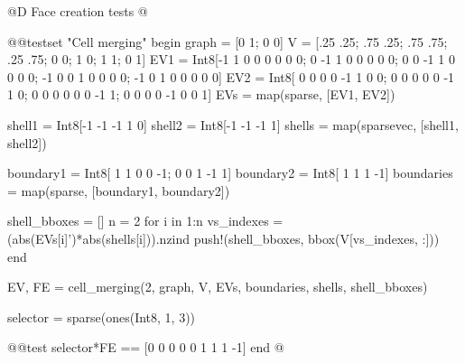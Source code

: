 @D Face creation tests
@{@@testset "Cell merging" begin
    graph = [0 1; 0 0]
    V = [.25 .25; .75 .25; .75 .75; .25 .75;
           0   0;   1   0;   1   1;   0   1]
    EV1 = Int8[-1  1  0  0  0  0  0  0;
                0 -1  1  0  0  0  0  0;
                0  0 -1  1  0  0  0  0;
               -1  0  0  1  0  0  0  0;
               -1  0  1  0  0  0  0  0]
    EV2 = Int8[ 0  0  0  0 -1  1  0  0;
                0  0  0  0  0 -1  1  0;
                0  0  0  0  0  0 -1  1;
                0  0  0  0 -1  0  0  1]
    EVs = map(sparse, [EV1, EV2])

    shell1 = Int8[-1 -1 -1  1  0]
    shell2 = Int8[-1 -1 -1  1]
    shells = map(sparsevec, [shell1, shell2])

    boundary1 = Int8[ 1  1  0  0 -1;
                      0  0  1 -1  1]
    boundary2 = Int8[ 1  1  1 -1]
    boundaries = map(sparse, [boundary1, boundary2])

    shell_bboxes = []
    n = 2
    for i in 1:n
        vs_indexes = (abs(EVs[i]')*abs(shells[i])).nzind
        push!(shell_bboxes, bbox(V[vs_indexes, :]))
    end

    EV, FE = cell_merging(2, graph, V, EVs, boundaries, shells, shell_bboxes)

    selector = sparse(ones(Int8, 1, 3))

    @@test selector*FE == [0  0  0  0  0  1  1  1 -1]
end
@}